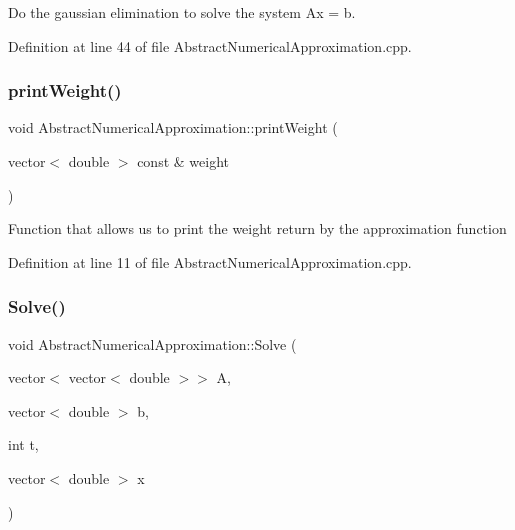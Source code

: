 Do the gaussian elimination to solve the system Ax = b. 



Definition at line 44 of file Abstract\+Numerical\+Approximation.\+cpp.

\mbox{\label{class_abstract_numerical_approximation_a841c83a7ae9f2146001581f3a7f8444a}} 
\subsubsection{\texorpdfstring{print\+Weight()}{printWeight()}}
{\footnotesize\ttfamily void Abstract\+Numerical\+Approximation\+::print\+Weight (\begin{DoxyParamCaption}\item[{vector$<$ double $>$ const \&}]{weight }\end{DoxyParamCaption})}



Function that allows us to print the weight return by the approximation function 



Definition at line 11 of file Abstract\+Numerical\+Approximation.\+cpp.

\mbox{\label{class_abstract_numerical_approximation_adbbdee2940b7181abd9d8e968dea8927}} 
\subsubsection{\texorpdfstring{Solve()}{Solve()}}
{\footnotesize\ttfamily void Abstract\+Numerical\+Approximation\+::\+Solve (\begin{DoxyParamCaption}\item[{vector$<$ vector$<$ double $>$$>$}]{A,  }\item[{vector$<$ double $>$}]{b,  }\item[{int}]{t,  }\item[{vector$<$ double $>$}]{x }\end{DoxyParamCaption})}



